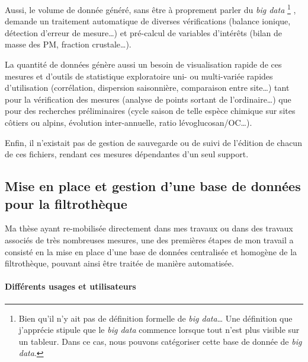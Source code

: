 Aussi, le volume de donnée généré, sans être à proprement parler du \textit{big data}
\footnote{Bien qu'il n'y ait pas de définition formelle de \textit{big data}…  Une
    définition que j'apprécie stipule que le \textit{big data} commence lorsque tout
    n'est plus visible sur un tableur. Dans ce cas, nous pouvons catégoriser cette base de
donnée de \textit{big data}.}
, demande un traitement automatique de diverses vérifications (balance ionique, détection
d'erreur de mesure…) et pré-calcul de variables d'intérêts (bilan de masse des PM,
fraction crustale…).

La quantité de données génère aussi un besoin de visualisation rapide de ces mesures et
d'outils de statistique exploratoire uni- ou multi-variée rapides d'utilisation
(corrélation, dispersion saisonnière, comparaison entre site…) tant pour la vérification
des mesures (analyse de points sortant de l'ordinaire…) que pour des recherches
préliminaires (cycle saison de telle espèce chimique sur sites côtiers ou alpins, évolution
inter-annuelle, ratio lévoglucosan/OC…).

Enfin, il n'existait pas de gestion de sauvegarde ou de suivi de l'édition
de chacun de ces fichiers, rendant ces mesures dépendantes d'un seul support.

\subsection{Mise en place et gestion d'une base de données pour la filtrothèque}%
\label{sub:mise_en_place_et_gestion_d_une_base_de_donnée_pour_la_filtrothèque}

\begin{tcolorbox}[colback=red!5!white,colframe=Melon,title=Note]
Ma thèse ayant re-mobilisée directement dans mes travaux ou dans des travaux associés de
très nombreuses mesures, une des premières étapes de mon travail a consisté en la mise en place d'une
base de données centralisée et homogène de la filtrothèque, pouvant ainsi être traitée de
manière automatisée.
\end{tcolorbox}

\paragraph{Différents usages et utilisateurs}%
\label{par:différents_usages_et_utilisateurs}

